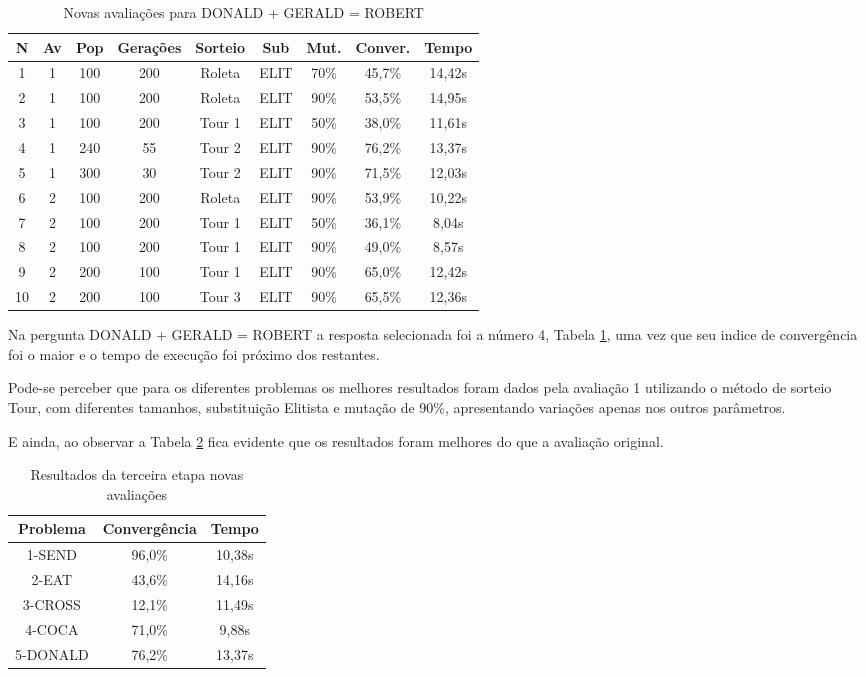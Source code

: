 \documentclass[a4paper, 12pt]{article}
\begin{document}
  \begin{table}[H]
    \centering
    \begin{tabular}{|c|c|c|c|c|c|c|c|c|}
      \hline
      N&Av & Pop & Gerações & Sorteio & Sub & Mut. & Conver. & Tempo  \\
      \hline
      1&1 & 100 & 200 & Roleta & ELIT & 70\% &45,7\% & 14,42s\\
      \hline
      2&1 & 100 & 200 & Roleta & ELIT & 90\% &53,5\% & 14,95s\\
      \hline
      3&1 & 100 & 200 & Tour 1 & ELIT & 50\% &38,0\% & 11,61s\\
      \hline
      4&1 & 240 & 55 & Tour 2 & ELIT & 90\% &76,2\% & 13,37s\\
      \hline
      5&1 & 300 & 30 & Tour 2 & ELIT & 90\% &71,5\% & 12,03s\\
      \hline
      6&2 & 100 & 200 & Roleta & ELIT & 90\% &53,9\% & 10,22s\\
      \hline
      7&2 & 100 & 200 & Tour 1 & ELIT & 50\% &36,1\% & 8,04s\\
      \hline
      8&2 & 100 & 200 & Tour 1 & ELIT & 90\% &49,0\% & 8,57s\\
      \hline
      9&2 & 200 & 100 & Tour 1 & ELIT & 90\% &65,0\% & 12,42s\\
      \hline
      10&2 & 200 & 100 & Tour 3 & ELIT & 90\% &65,5\% & 12,36s\\
      \hline
    \end{tabular}
    \caption{Novas avaliações para DONALD + GERALD = ROBERT}
    \label{tab:donald}
  \end{table}

  Na pergunta DONALD + GERALD = ROBERT a resposta selecionada foi a número 4,
  Tabela \ref{tab:donald}, uma vez que seu indice de convergência foi o maior
  e o tempo de execução foi próximo dos restantes.

  Pode-se perceber que para os diferentes problemas os melhores resultados
  foram dados pela avaliação 1 utilizando o método de sorteio Tour, com diferentes
  tamanhos, substituição Elitista e mutação de 90\%, apresentando variações apenas
  nos outros parâmetros.

  E ainda, ao observar a Tabela \ref{tab:etapa3melhorada} fica evidente que os resultados
  foram melhores do que a avaliação original.

  \begin{table}[H]
    \centering
    \begin{tabular}{|c|c|c|}
      \hline
      Problema & Convergência & Tempo \\
      \hline
      1-SEND & 96,0\% & 10,38s \\
      \hline
      2-EAT & 43,6\% & 14,16s \\
      \hline
      3-CROSS & 12,1\% & 11,49s \\
      \hline
      4-COCA & 71,0\% & 9,88s \\
      \hline
      5-DONALD & 76,2\% & 13,37s \\
      \hline
    \end{tabular}
    \caption{Resultados da terceira etapa novas avaliações}
    \label{tab:etapa3melhorada}
  \end{table}
\end{document}
